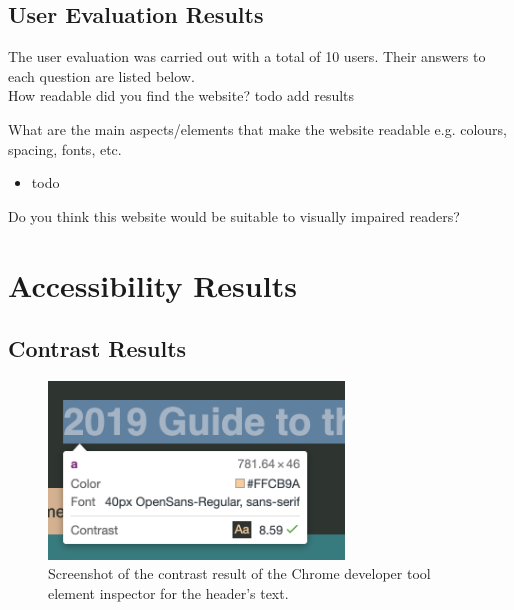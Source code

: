 \documentclass[letterpaper,12pt]{article}
\begin{document}
\begin{appendices}
\subsection{User Evaluation Results}

The user evaluation was carried out with a total of 10 users. Their answers to each question are listed below.\\

How readable did you find the website?
todo add results

What are the main aspects/elements that make the website readable e.g. colours, spacing, fonts, etc.\\

\begin{itemize}
    \item todo
\end{itemize}

Do you think this website would be suitable to visually impaired readers?

\clearpage
\section{Accessibility Results}
\label{sec:appendix-accessibility-results}

\subsection{Contrast Results}
\label{sec:appendix-accessibility-results-contrast}

\begin{figure}[h] 
\centerline{\includegraphics[width=0.7\textwidth]{report/images/accessibility-contrast-header.png}}
\caption{\label{fig:accessibility-contrast-header}Screenshot of the contrast result of the Chrome developer tool element inspector for the header's text.}
\end{figure}


\end{appendices}
\end{document}

